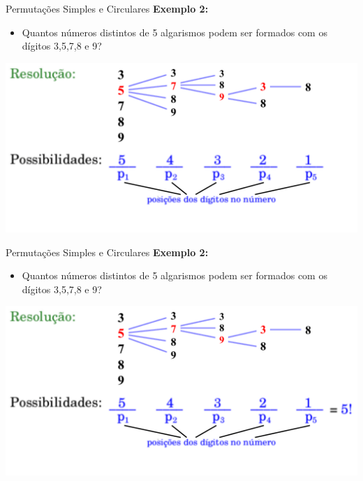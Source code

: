 \documentclass[aspectratio=169]{beamer}
\begin{document}
\begin{frame}{Permutações Simples e Circulares}
    \textbf{Exemplo 2:}

    \vspace{3mm}

    \begin{itemize}
        \item[] Quantos números distintos de 5 algarismos podem ser formados com os dígitos 3,5,7,8 e 9?
    \end{itemize}

    \begin{center}
        \includegraphics[width=0.75\linewidth]{figs/Exemplo2_10.png}
    \end{center}
\end{frame}

\begin{frame}{Permutações Simples e Circulares}
    \textbf{Exemplo 2:}

    \vspace{3mm}

    \begin{itemize}
        \item[] Quantos números distintos de 5 algarismos podem ser formados com os dígitos 3,5,7,8 e 9?
    \end{itemize}

    \begin{center}
        \includegraphics[width=0.75\linewidth]{figs/Exemplo2_11.png}
    \end{center}
\end{frame}
\end{document}
